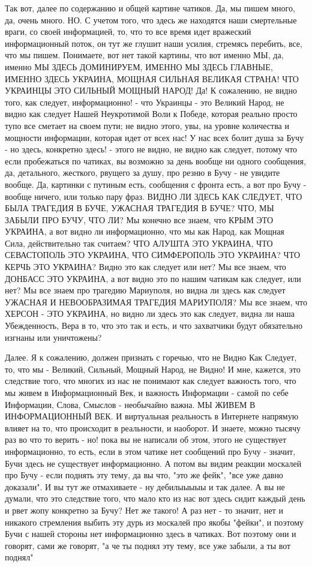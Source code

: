 Так вот, далее по содержанию и общей картине чатиков. Да, мы пишем много, да,
очень много.  НО. С учетом того, что здесь же находятся наши смертельные враги,
со своей информацией, то, что то все время идет вражеский информационный поток,
он тут же глушит наши усилия, стремясь перебить, все, что мы пишем. Понимаете,
вот нет такой картины, что вот именно МЫ, да, именно МЫ ЗДЕСЬ ДОМИНИРУЕМ,
ИМЕННО МЫ ЗДЕСЬ ГЛАВНЫЕ, ИМЕННО ЗДЕСЬ УКРАИНА, МОЩНАЯ СИЛЬНАЯ ВЕЛИКАЯ СТРАНА!
ЧТО УКРАИНЦЫ ЭТО СИЛЬНЫЙ МОЩНЫЙ НАРОД!  Да! К сожалению, не видно того, как следует,
информационно! - что Украинцы - это Великий Народ, не видно как следует Нашей
Неукротимой Воли к Победе, которая реально просто тупо все сметает на своем
пути; не видно этого, увы, на уровне количества и мощности информации, которая
идет от всех нас!  У нас всех болит душа за Бучу - но здесь, конкретно здесь! -
этого не видно, не видно как следует, потому что если пробежаться по чатиках,
вы возможно за день вообще ни одного сообщения, да, детального, жесткого,
рвущего за душу, про резню в Бучу - не увидите вообще. Да, картинки с путиным
есть, сообщения с фронта есть, а вот про Бучу - вообще ничего, или только пару
фраз.  ВИДНО ЛИ ЗДЕСЬ КАК СЛЕДУЕТ, ЧТО БЫЛА ТРАГЕДИЯ В БУЧЕ, УЖАСНАЯ ТРАГЕДИЯ В
БУЧЕ?  ЧТО, МЫ ЗАБЫЛИ ПРО БУЧУ, ЧТО ЛИ?  Мы конечно все знаем, что КРЫМ ЭТО
УКРАИНА, а вот видно ли информационно, что мы как Народ, как Мощная Сила,
действительно так считаем? ЧТО АЛУШТА ЭТО УКРАИНА, ЧТО СЕВАСТОПОЛЬ ЭТО УКРАИНА,
ЧТО СИМФЕРОПОЛЬ ЭТО УКРАИНА? ЧТО КЕРЧЬ ЭТО УКРАИНА? Видно это как следует или
нет? Мы все знаем, что ДОНБАСС ЭТО УКРАИНА, а вот видно это по нашим чатикам
как следует, или нет? Мы все знаем про трагедию Мариуполя, но видна ли здесь
как следует УЖАСНАЯ И НЕВООБРАЗИМАЯ ТРАГЕДИЯ МАРИУПОЛЯ?  Мы все знаем, что
ХЕРСОН - ЭТО УКРАИНА, но видно ли здесь это как следует, видна ли наша
Убежденность, Вера в то, что это так и есть, и что захватчики будут обязательно
изгнаны или уничтожены?

Далее. Я к сожалению, должен признать с горечью, что не Видно Как Следует, то,
что мы - Великий, Сильный, Мощный Народ, не Видно! И мне, кажется, это
следствие того, что многих из нас не понимают как следует важность того, что мы
живем в Информационный Век, и важность Информации - самой по себе Информации,
Слова, Смыслов - необычайно важна.  МЫ ЖИВЕМ В ИНФОРМАЦИОННЫЙ ВЕК. И
виртуальная реальность в Интернете напрямую влияет на то, что происходит в
реальности, и наоборот. И знаете, можно тысячу раз во что то верить - но! пока
вы не написали об этом, этого не существует информационно, то есть, если в этом
чатике нет сообщений про Бучу - значит, Бучи здесь не существует информационно.
А потом вы видим реакции москалей про Бучу - если поднять эту тему, да вы что,
"это же фейк", "все уже давно доказали". И вы тут же отмахиваете - ну
дебилыыыыы и так далее. А вы не думали, что это следствие того, что мало кто из
нас вот здесь сидит каждый день и рвет жопу конкретно за Бучу? Нет же такого!
А раз нет - то значит, нет и никакого стремления выбить эту дурь из москалей
про якобы "фейки", и поэтому Бучи с нашей стороны нет информационно здесь в
чатиках. Вот поэтому они и говорят, сами же говорят, "а че ты поднял эту тему,
все уже забыли, а ты вот поднял"

